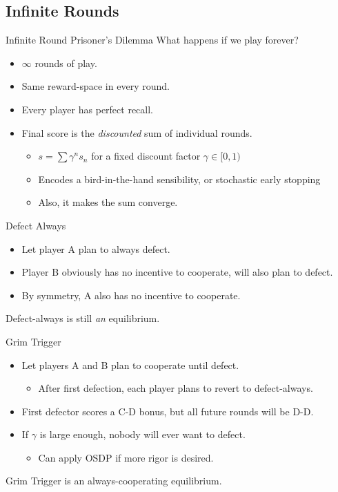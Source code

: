 \documentclass[pdf]{beamer}
\begin{document}
\subsection{Infinite Rounds}
\begin{frame}{Infinite Round Prisoner's Dilemma}
  What happens if we play forever?

  \begin{itemize}
  \item $\infty$ rounds of play.
  \item Same reward-space in every round.
  \item Every player has perfect recall.
  \item Final score is the \emph{discounted} sum of individual rounds.
    \begin{itemize}
    \item $s = \sum \gamma^n s_n$ for a fixed discount factor $\gamma \in [0, 1)$
    \pause\item Encodes a bird-in-the-hand sensibility, or stochastic early stopping
    \pause\item Also, it makes the sum converge.
    \end{itemize}
  \end{itemize}
\end{frame}

\begin{frame}{Defect Always}
  \begin{itemize}
    \item Let player A plan to always defect.
    \pause\item Player B obviously has no incentive to cooperate, will also plan to defect.
    \pause\item By symmetry, A also has no incentive to cooperate.
  \end{itemize}\pause
 
  Defect-always is still \emph{an} equilibrium.
\end{frame}

\begin{frame}{Grim Trigger}
  \begin{itemize}
    \item Let players A and B plan to cooperate until defect.
    \begin{itemize}
      \item After first defection, each player plans to revert to defect-always.
    \end{itemize}
    \pause\item First defector scores a C-D bonus, but all future rounds will be D-D.
    \pause\item If $\gamma$ is large enough, nobody will ever want to defect.
    \begin{itemize}
      \item Can apply OSDP if more rigor is desired.
    \end{itemize}
  \end{itemize}

  \pause Grim Trigger is an always-cooperating equilibrium.
\end{frame}
\end{document}
